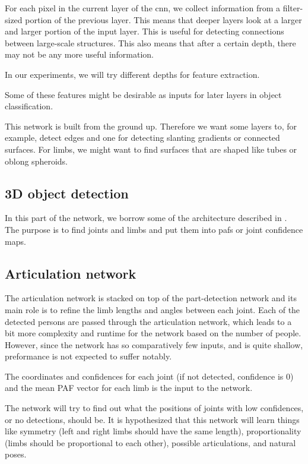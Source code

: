 For each pixel in the current layer of the \gls{cnn}, we collect information from a filter-sized portion of the previous layer. This means that deeper layers look at a larger and larger portion of the input layer. This is useful for detecting connections between large-scale structures. This also means that after a certain depth, there may not be any more useful information.

In our experiments, we will try different depths for feature extraction.

Some of these features might be desirable as inputs for later layers in object classification.

This network is built from the ground up. Therefore we want some layers to, for example, detect edges and one for detecting slanting gradients or connected surfaces. For limbs, we might want to find surfaces that are shaped like tubes or oblong spheroids.

\subsection{3D object detection}\label{subsec:obj_detect}
In this part of the network, we borrow some of the architecture described in \cite{cao2017realtime}. The purpose is to find joints and limbs and put them into \gls{paf}s or joint confidence maps. 

\subsection{Articulation network}\label{subsec:articulation}
The articulation network is stacked on top of the part-detection network and its main role is to refine the limb lengths and angles between each joint. Each of the detected persons are passed through the articulation network, which leads to a bit more complexity and runtime for the network based on the number of people. However, since the network has so comparatively few inputs, and is quite shallow, preformance is not expected to suffer notably.

The coordinates and confidences for each joint (if not detected, confidence is 0) and the mean PAF vector for each limb is the input to the network.

The network will try to find out what the positions of joints with low confidences, or no detections, should be. It is hypothesized that this network will learn things like symmetry (left and right limbs should have the same length), proportionality (limbs should be proportional to each other), possible articulations, and natural poses.

